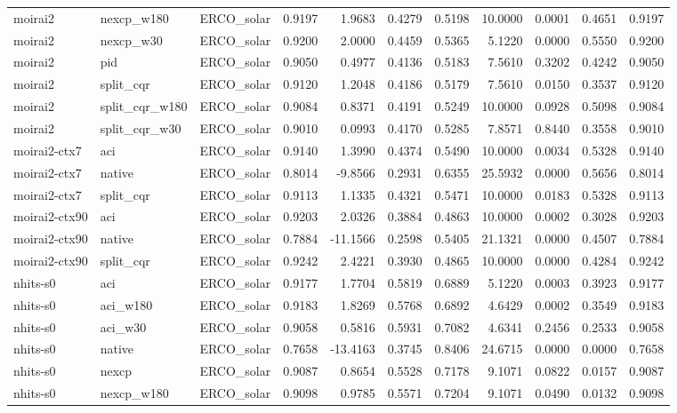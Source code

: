 \begin{tabular}{lllrrrrrrrr}
moirai2 & nexcp_w180 & ERCO_solar & 0.9197 & 1.9683 & 0.4279 & 0.5198 & 10.0000 & 0.0001 & 0.4651 & 0.9197 \\
moirai2 & nexcp_w30 & ERCO_solar & 0.9200 & 2.0000 & 0.4459 & 0.5365 & 5.1220 & 0.0000 & 0.5550 & 0.9200 \\
moirai2 & pid & ERCO_solar & 0.9050 & 0.4977 & 0.4136 & 0.5183 & 7.5610 & 0.3202 & 0.4242 & 0.9050 \\
moirai2 & split_cqr & ERCO_solar & 0.9120 & 1.2048 & 0.4186 & 0.5179 & 7.5610 & 0.0150 & 0.3537 & 0.9120 \\
moirai2 & split_cqr_w180 & ERCO_solar & 0.9084 & 0.8371 & 0.4191 & 0.5249 & 10.0000 & 0.0928 & 0.5098 & 0.9084 \\
moirai2 & split_cqr_w30 & ERCO_solar & 0.9010 & 0.0993 & 0.4170 & 0.5285 & 7.8571 & 0.8440 & 0.3558 & 0.9010 \\
moirai2-ctx7 & aci & ERCO_solar & 0.9140 & 1.3990 & 0.4374 & 0.5490 & 10.0000 & 0.0034 & 0.5328 & 0.9140 \\
moirai2-ctx7 & native & ERCO_solar & 0.8014 & -9.8566 & 0.2931 & 0.6355 & 25.5932 & 0.0000 & 0.5656 & 0.8014 \\
moirai2-ctx7 & split_cqr & ERCO_solar & 0.9113 & 1.1335 & 0.4321 & 0.5471 & 10.0000 & 0.0183 & 0.5328 & 0.9113 \\
moirai2-ctx90 & aci & ERCO_solar & 0.9203 & 2.0326 & 0.3884 & 0.4863 & 10.0000 & 0.0002 & 0.3028 & 0.9203 \\
moirai2-ctx90 & native & ERCO_solar & 0.7884 & -11.1566 & 0.2598 & 0.5405 & 21.1321 & 0.0000 & 0.4507 & 0.7884 \\
moirai2-ctx90 & split_cqr & ERCO_solar & 0.9242 & 2.4221 & 0.3930 & 0.4865 & 10.0000 & 0.0000 & 0.4284 & 0.9242 \\
nhits-s0 & aci & ERCO_solar & 0.9177 & 1.7704 & 0.5819 & 0.6889 & 5.1220 & 0.0003 & 0.3923 & 0.9177 \\
nhits-s0 & aci_w180 & ERCO_solar & 0.9183 & 1.8269 & 0.5768 & 0.6892 & 4.6429 & 0.0002 & 0.3549 & 0.9183 \\
nhits-s0 & aci_w30 & ERCO_solar & 0.9058 & 0.5816 & 0.5931 & 0.7082 & 4.6341 & 0.2456 & 0.2533 & 0.9058 \\
nhits-s0 & native & ERCO_solar & 0.7658 & -13.4163 & 0.3745 & 0.8406 & 24.6715 & 0.0000 & 0.0000 & 0.7658 \\
nhits-s0 & nexcp & ERCO_solar & 0.9087 & 0.8654 & 0.5528 & 0.7178 & 9.1071 & 0.0822 & 0.0157 & 0.9087 \\
nhits-s0 & nexcp_w180 & ERCO_solar & 0.9098 & 0.9785 & 0.5571 & 0.7204 & 9.1071 & 0.0490 & 0.0132 & 0.9098 \\

\end{tabular}
